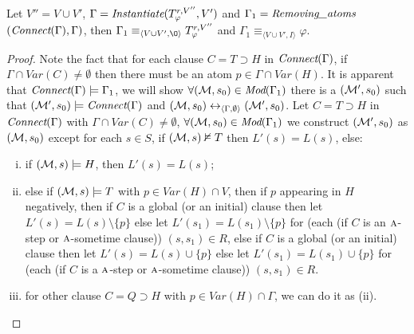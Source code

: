 \documentclass[runningheads]{llncs}
\newcommand{\tuple}[1]{{\langle{#1}\rangle}}
\newcommand{\Mod}{\textit{Mod}}
\newcommand{\lrto}{\leftrightarrow}
\newcommand{\Var}{\textit{Var}}
\newcommand{\Hm} {{\cal M}}
\newcommand{\ALL}{\textsc{a}}
\begin{document}
\begin{proposition}\label{pro:elm}
Let $V''=V \cup V'$, $\Gamma=\emph{Instantiate}(T_{\varphi}^{r, V''}, V')$ and $\Gamma_1=\emph{Removing\_atoms}$ $(\emph{Connect}(\Gamma), \Gamma)$, then  $\Gamma_1\equiv_{\tuple{V\cup V', {\O}}} T_{\varphi}^{r, V''}$ and $\Gamma_1 \equiv_{\tuple{V \cup V', I}} \varphi$.
\end{proposition}
\begin{proof}
Note the fact that for each clause $C = T \supset H$ in $\emph{Connect}(\Gamma)$, if $\Gamma \cap \Var(C) \neq \emptyset$ then there must be an atom $p\in \Gamma \cap \Var(H)$. It is apparent that $\emph{Connect}(\Gamma) \models \Gamma_1$, we will show $\forall (\Hm, s_0) \in \Mod(\Gamma_1)$ there is a $(\Hm', s_0)$ such that $(\Hm', s_0) \models \emph{Connect}(\Gamma)$ and $(\Hm, s_0) \lrto_{\tuple{\Gamma, \emptyset}} (\Hm', s_0)$.
Let $C = T \supset H$ in $\emph{Connect}(\Gamma)$ with $\Gamma \cap \Var(C) \neq \emptyset$,
$\forall (\Hm, s_0) \in \Mod(\Gamma_1)$ we construct $(\Hm', s_0)$ as $(\Hm, s_0)$ except
 for each $s\in S$, if $(\Hm, s) \nvDash T$ then $L'(s) = L(s)$, else:
\begin{enumerate}[(i)]
  \item if $(\Hm,s) \models H$, then $L'(s) = L(s)$;
  \item else if $(\Hm, s) \models T$ with $p \in \Var(H)\cap V$, then if $p$ appearing in $H$ negatively, then if $C$ is a global (or an initial) clause then let $L'(s) = L(s) \setminus \{p\}$ else let $L'(s_1) = L(s_1) \setminus \{p\}$ for (each (if $C$ is an $\ALL$-step or $\ALL$-sometime clause)) $(s,s_1) \in R$, else if $C$ is a global (or an initial) clause then let $L'(s) = L(s) \cup \{p\}$ else let $L'(s_1) = L(s_1) \cup \{p\}$ for (each (if $C$ is a $\ALL$-step or $\ALL$-sometime clause)) $(s,s_1) \in R$.
  \item for other clause $C=Q\supset H$ with $p\in \Var(H)\cap \Gamma$, we can do it as (ii).
\end{enumerate}


\end{proof}
\end{document}
